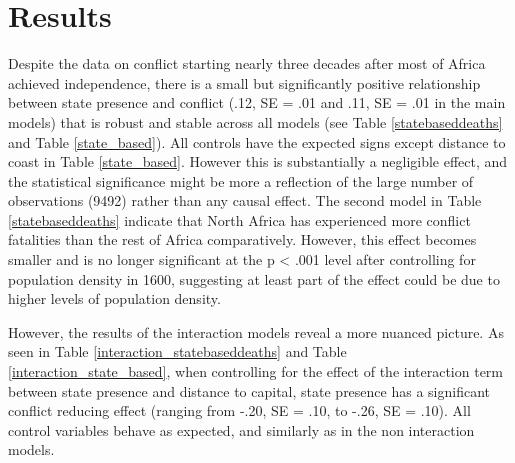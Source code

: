 \documentclass[12pt]{article}
\begin{document}
\section{Results}

Despite the data on conflict starting nearly three decades after most of Africa
achieved independence, there is a small but significantly positive relationship
between state presence and conflict (.12, SE = .01 and .11, SE = .01 in the main
models) that is robust and stable across all models (see Table
\ref{statebaseddeaths} and Table \ref{state_based}). All controls have the
expected signs except distance to coast in Table \ref{state_based}. However this
is substantially a negligible effect, and the statistical significance might be
more a reflection of the large number of observations (9492) rather than any
causal effect. The second model in Table \ref{statebaseddeaths} indicate that
North Africa has experienced more conflict fatalities than the rest of Africa
comparatively. However, this effect becomes smaller and is no longer significant
at the p < .001 level after controlling for population density in 1600,
suggesting at least part of the effect could be due to higher levels of
population density.

However, the results of the interaction models reveal a more nuanced picture. As
seen in Table \ref{interaction_statebaseddeaths} and Table
\ref{interaction_state_based}, when controlling for the effect of the
interaction term between state presence and distance to capital, state presence
has a significant conflict reducing effect (ranging from -.20, SE = .10, to
-.26, SE = .10). All control variables behave as expected, and similarly as in
the non interaction models.
\end{document}
